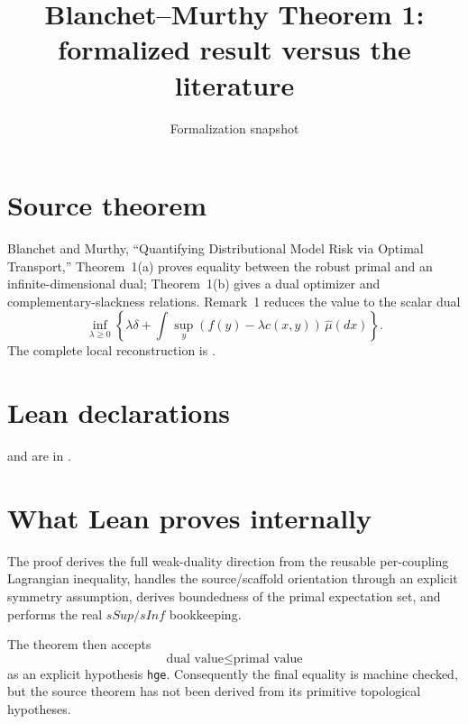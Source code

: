 \title{Blanchet--Murthy Theorem 1: formalized result versus the literature}
\author{}
\date{Formalization snapshot \snapshot}

\maketitle
{}
\section{Source theorem}
Blanchet and Murthy, ``Quantifying Distributional Model Risk via Optimal Transport,'' Theorem~1(a) proves equality between the robust primal and an infinite-dimensional dual; Theorem~1(b) gives a dual optimizer and complementary-slackness relations.  Remark~1 reduces the value to the scalar dual
\[
 \inf_{\lambda\ge0}\left\{\lambda\delta+
 \int \sup_y(f(y)-\lambda c(x,y))\,\widehat\mu(dx)\right\}.
\]
The complete local reconstruction is
.

\section{Lean declarations}
 and
 are in
.

\section{What Lean proves internally}
The proof derives the full weak-duality direction from the reusable per-coupling Lagrangian inequality, handles the source/scaffold orientation through an explicit symmetry assumption, derives boundedness of the primal expectation set, and performs the real $sSup/sInf$ bookkeeping.

The theorem then accepts
\[
 \text{dual value}\le \text{primal value}
\]
as an explicit hypothesis \texttt{hge}.  Consequently the final equality is machine checked, but the source theorem has not been derived from its primitive topological hypotheses.

